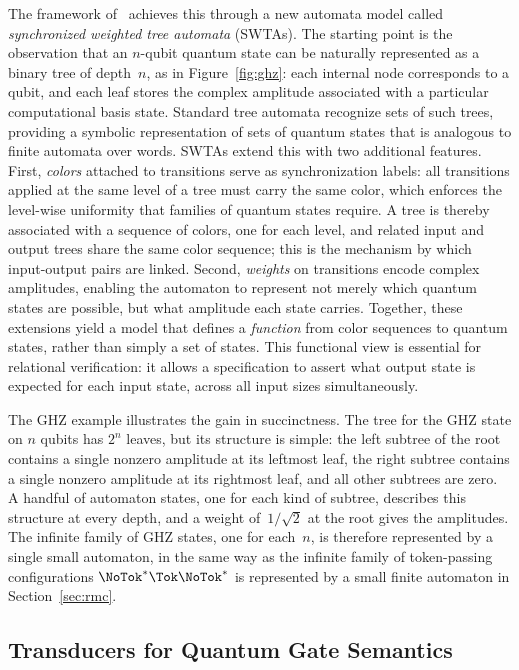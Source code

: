 The framework of~\cite{AutoQPara} achieves this through a new automata model
called \emph{synchronized weighted tree automata} (SWTAs). The starting point
is the observation that an $n$-qubit quantum state can be naturally represented
as a binary tree of depth~$n$, as in Figure~\ref{fig:ghz}: each internal node
corresponds to a qubit, and each leaf stores the complex amplitude associated
with a particular computational basis state. Standard tree automata recognize
sets of such trees, providing a symbolic representation of sets of quantum
states that is analogous to finite automata over words. SWTAs extend this with
two additional features. First, \emph{colors} attached to transitions serve as
synchronization labels: all transitions applied at the same level of a tree
must carry the same color, which enforces the level-wise uniformity that
families of quantum states require. A tree is thereby associated with a
sequence of colors, one for each level, and related input and output trees
share the same color sequence; this is the mechanism by which input-output
pairs are linked. Second, \emph{weights} on transitions encode
complex amplitudes, enabling the automaton to represent not merely which
quantum states are possible, but what amplitude each state carries. Together,
these extensions yield a model that defines a \emph{function} from color
sequences to quantum states, rather than simply a set of states. This
functional view is essential for relational verification: it allows a
specification to assert what output state is expected for each input state,
across all input sizes simultaneously.

The GHZ example illustrates the gain in succinctness. The tree for the GHZ
state on $n$ qubits has $2^n$ leaves, but its structure is simple: the left
subtree of the root contains a single nonzero amplitude at its leftmost leaf,
the right subtree contains a single nonzero amplitude at its rightmost leaf,
and all other subtrees are zero. A handful of automaton states, one for each
kind of subtree, describes this structure at every depth, and a weight
of~$1/\sqrt{2}$ at the root gives the amplitudes. The infinite family of GHZ
states, one for each~$n$, is therefore represented by a single small
automaton, in the same way as the infinite family of token-passing
configurations $\NoTok^*\Tok\NoTok^*$ is represented by a small finite
automaton in Section~\ref{sec:rmc}.

\subsection{Transducers for Quantum Gate Semantics}

